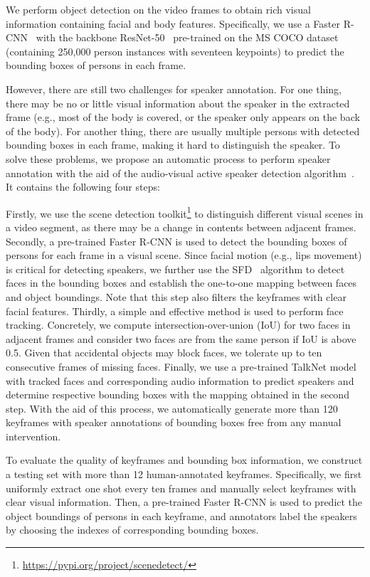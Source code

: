 \documentclass[sigconf,camera-ready]{acmart}
\begin{document}
We perform object detection on the video frames to obtain rich visual information containing facial and body features. Specifically,  we use a Faster R-CNN~\cite{ren2015faster} with the backbone ResNet-50~\cite{he2016deep} pre-trained on the MS COCO dataset~\cite{lin2014microsoft} (containing 250,000 person instances with seventeen keypoints) to predict the bounding boxes of persons in each frame. 

However, there are still two challenges for speaker annotation. For one thing, there may be no or little visual information about the speaker in the extracted frame (e.g., most of the body is covered, or the speaker only appears on the back of the body). For another thing, there are usually multiple persons with detected bounding boxes in each frame, making it hard to distinguish the speaker. To solve these problems, we propose an automatic process to perform speaker annotation with the aid of the audio-visual active speaker detection algorithm~\cite{chung2016out,tao2021someone}. It contains the following four steps:

Firstly, we use the scene detection toolkit\footnote{\url{https://pypi.org/project/scenedetect/}} to distinguish different visual scenes in a video segment, as there may be a change in contents between adjacent frames. Secondly, a pre-trained Faster R-CNN is used to detect the bounding boxes of persons for each frame in a visual scene. Since facial motion (e.g., lips movement) is critical for detecting speakers, we further use the SFD~\cite{zhang2017s3fd} algorithm to detect faces in the bounding boxes and establish the one-to-one mapping between faces and object boundings. Note that this step also filters the keyframes with clear facial features. Thirdly, a simple and effective method is used to perform face tracking. Concretely, we compute intersection-over-union (IoU) for two faces in adjacent frames and consider two faces are from the same person if IoU is above 0.5. Given that accidental objects may block faces, we tolerate up to ten consecutive frames of missing faces. Finally, we use a pre-trained TalkNet model with tracked faces and corresponding audio information to predict speakers and determine respective bounding boxes with the mapping obtained in the second step. With the aid of this process, we automatically generate more than 120 keyframes with speaker annotations of bounding boxes free from any manual intervention. 

To evaluate the quality of keyframes and bounding box information, we construct a testing set with more than 12 human-annotated keyframes. Specifically, we first uniformly extract one shot every ten frames and manually select keyframes with clear visual information. Then, a pre-trained Faster R-CNN is used to predict the object boundings of persons in each keyframe, and annotators label the speakers by choosing the indexes of corresponding bounding boxes.
\end{document}

